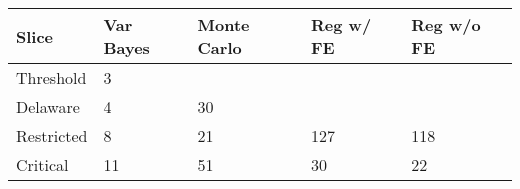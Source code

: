 \begin{tabular}{lllll}
  \hline
Slice & Var Bayes & Monte Carlo & Reg w/ FE & Reg w/o FE \\ 
  \hline
Threshold & 3 & ~ & ~ & ~ \\ 
  Delaware & 4 & 30 & ~ & ~ \\ 
  Restricted & 8 & 21 & 127 & 118 \\ 
  Critical & 11 & 51 & 30 & 22 \\ 
   \hline
\end{tabular}
